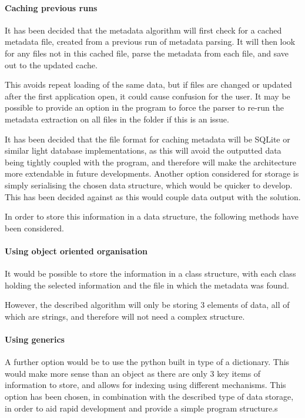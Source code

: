 \paragraph{Caching previous runs}
It has been decided that the metadata algorithm will first check for a cached metadata file, created from a previous run of metadata parsing. It will then look for any files not in this cached file, parse the metadata from each file, and save out to the updated cache.

This avoids repeat loading of the same data, but if files are changed or updated after the first application open, it could cause confusion for the user. It may be possible to provide an option in the program to force the parser to re-run the metadata extraction on all files in the folder if this is an issue.

It has been decided that the file format for caching metadata will be SQLite or similar light database implementations, as this will avoid the outputted data being tightly coupled with the program, and therefore will make the architecture more extendable in future developments. Another option considered for storage is simply serialising the chosen data structure, which would be quicker to develop. This has been decided against as this would couple data output with the solution.

In order to store this information in a data structure, the following methods have been considered.

\paragraph{Using object oriented organisation}
It would be possible to store the information in a class structure, with each class holding the selected information and the file in which the metadata was found.

However, the described algorithm will only be storing 3 elements of data, all of which are strings, and therefore will not need a complex structure.

\paragraph{Using generics}
A further option would be to use the python built in type of a dictionary. This would make more sense than an object as there are only 3 key items of information to store, and allows for indexing using different mechanisms. This option has been chosen, in combination with the described type of data storage, in order to aid rapid development and provide a simple program structure.s


